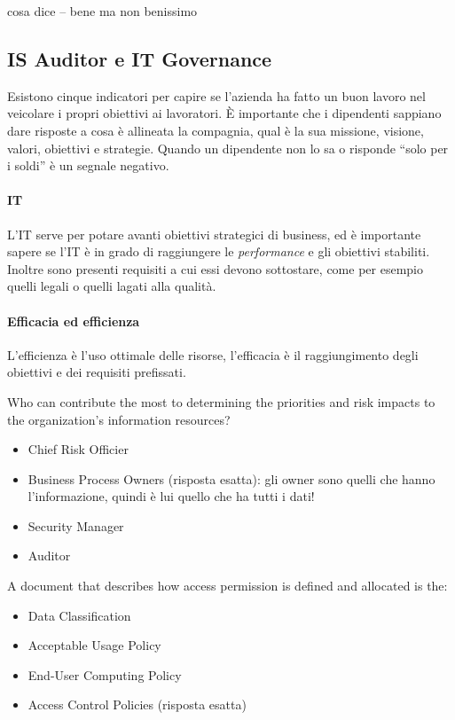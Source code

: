 cosa dice -- bene ma non benissimo

\subsection{IS Auditor e IT Governance}

Esistono cinque indicatori per capire se l'azienda ha fatto un buon lavoro nel 
veicolare i propri obiettivi ai lavoratori. È importante che i dipendenti 
sappiano dare risposte a cosa è allineata la compagnia, qual è la sua missione, 
visione, valori, obiettivi e strategie. Quando un dipendente non lo sa o 
risponde ``solo per i soldi'' è un segnale negativo.

\paragraph*{IT} L'IT serve per potare avanti obiettivi strategici di business, 
ed è importante sapere se l'IT è in grado di raggiungere le \textit{performance} 
e gli obiettivi stabiliti. Inoltre sono presenti requisiti a cui essi devono 
sottostare, come per esempio quelli legali o quelli lagati alla qualità.

\paragraph*{Efficacia ed efficienza} L'efficienza è l'uso ottimale delle 
risorse, l'efficacia è il raggiungimento degli obiettivi e dei requisiti 
prefissati.





Who can contribute the most to determining the priorities and risk impacts to 
the organization's information resources?
\begin{itemize}
\item Chief Risk Officier
\item Business Process Owners (risposta esatta): gli owner sono quelli che hanno 
l'informazione, quindi è lui quello che ha tutti i dati!
\item Security Manager
\item Auditor
\end{itemize}

A document that describes how access permission is defined and allocated is the:
\begin{itemize}
\item Data Classification
\item Acceptable Usage Policy
\item End-User Computing Policy
\item Access Control Policies  (risposta esatta) %
\end{itemize}


